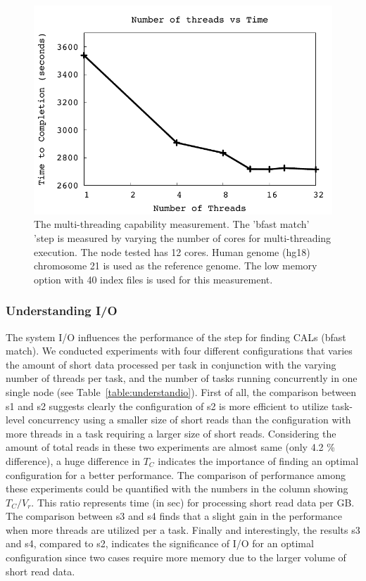 \documentclass{acm_proc_article-sp}
\begin{document}
 \begin{figure}
 \centering
\includegraphics[scale=0.66]{figures/threadsvstime.pdf} 

\caption{\small The multi-threading capability measurement.  The
  'bfast match' 'step is measured by varying the number of cores for
  multi-threading execution.  The node tested has 12 cores.  Human
  genome (hg18) chromosome 21 is used as the reference genome. The low
  memory option with 40 index files is used for this
  measurement.}
  \label{fig:parallel-execution} 
 \end{figure}

\subsubsection{Understanding I/O}

The system I/O influences the performance of the step for finding CALs (bfast match).  We conducted experiments with four different configurations that varies the amount of short data processed per task in conjunction with the varying number of threads per task, and the number of tasks running concurrently in one single node (see Table~\ref{table:understandio}).  First of all, the comparison between s1 and s2 suggests clearly the configuration of s2 is more efficient to utilize task-level concurrency using a smaller size of short reads than the configuration with more threads in a task requiring a larger size of short reads.  Considering the amount of total reads in these two experiments are almost same (only 4.2 \% difference), a huge difference in $T_C$ indicates the importance of finding an optimal configuration for a better performance.  The comparison of performance among these experiments could be quantified with the numbers in the column showing $T_C/V_r$.  This ratio represents time (in sec) for processing short read data per GB.  The comparison between s3 and s4 finds that  a slight gain in the performance when more threads are utilized per a task.  Finally and interestingly, the results s3 and s4, compared to s2, indicates the significance of I/O for an optimal configuration since two cases require more memory due to the larger volume of short read data. 
\end{document}
